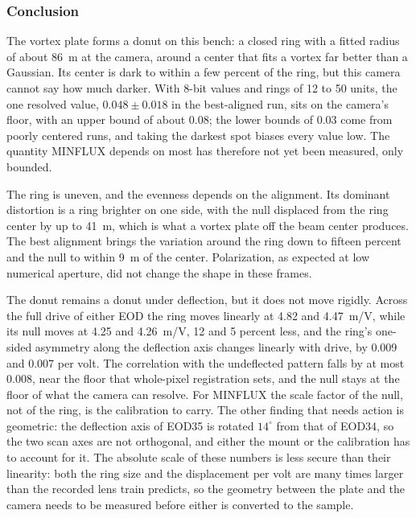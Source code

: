 \documentclass{article}
\begin{document}
\FloatBarrier %

\subsubsection{Conclusion}

The vortex plate forms a donut on this bench: a closed ring with a fitted radius of about
86~\textmu m at the camera, around a center that fits a vortex far better than a Gaussian. Its center is dark to within a
few percent of the ring, but this camera cannot say how much darker. With 8-bit values and rings of
12 to 50 units, the one resolved value, $0.048\pm0.018$ in the best-aligned run, sits on the
camera's floor, with an upper bound of about 0.08; the lower bounds of 0.03 come from poorly
centered runs, and taking the darkest spot biases every value low. The quantity MINFLUX depends on most has therefore not yet been measured, only bounded.

The ring is uneven, and the evenness depends on the alignment. Its dominant distortion is a ring
brighter on one side, with the null displaced from the ring center by up to 41~\textmu m, which is
what a vortex plate off the beam center produces. The best alignment brings the variation around the
ring down to fifteen percent and the null to within 9~\textmu m of the center. Polarization, as
expected at low numerical aperture, did not change the shape in these frames.

The donut remains a donut under deflection, but it does not move rigidly. Across the full drive of
either EOD the ring moves linearly at 4.82 and 4.47~\textmu m/V, while its null moves at 4.25 and
4.26~\textmu m/V, 12 and 5 percent less, and the ring's one-sided asymmetry along the deflection
axis changes linearly with drive, by 0.009 and 0.007 per volt. The correlation with the undeflected
pattern falls by at most 0.008, near the floor that whole-pixel registration sets, and the null
stays at the floor of what the camera can resolve. For MINFLUX the scale factor of the null, not of
the ring, is the calibration to carry. The other finding that needs action is geometric: the
deflection axis of EOD35 is rotated $14^\circ$ from that of EOD34, so the two scan axes are not
orthogonal, and either the mount or the calibration has to account for it. The absolute scale of
these numbers is less secure than their linearity: both the ring size and the displacement per volt
are many times larger than the recorded lens train predicts, so the geometry between the plate and
the camera needs to be measured before either is converted to the sample.
\end{document}
